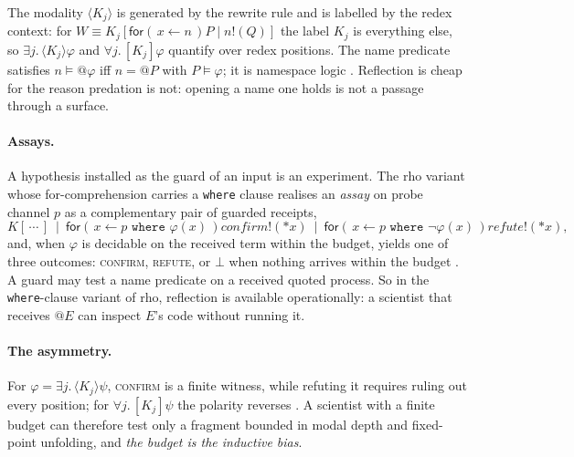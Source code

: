 \documentclass[11pt]{article}
\makeatletter
\theoremstyle{definition}
\theoremstyle{plain}
\theoremstyle{remark}
\newcommand{\quo}[1]{@#1}
\newcommand{\drp}[1]{{*}#1}
\newcommand{\inp}[3]{\mathsf{for}(\,#1 \leftarrow #2\,)#3}
\newcommand{\out}[2]{#1!(#2)}
\makeatother
\begin{document}
\noindent
The modality $\langle K_j\rangle$ is generated by the rewrite rule and is
labelled by the redex context: for $W \equiv K_j[\inp{x}{n}{P} \mid
\out{n}{Q}]$ the label $K_j$ is everything else, so $\exists j.\,\langle
K_j\rangle\varphi$ and $\forall j.\,[K_j]\varphi$ quantify over redex
positions. The name predicate satisfies $n \models @\varphi$ iff $n =
\quo{P}$ with $P \models \varphi$; it is namespace logic \cite{NamespaceLogic}.
Reflection is cheap for the reason predation is not: opening a name one
holds is not a passage through a surface.

\paragraph{Assays.} A hypothesis installed as the guard of an input is an
experiment. The rho variant whose for-comprehension carries a
\texttt{where} clause \cite{Omnibus} realises an \emph{assay} on probe
channel $p$ as a complementary pair of guarded receipts,
\[
K[\,\cdots\,] \ \mid\ \inp{x}{p \texttt{ where } \varphi(x)}{\out{\mathit{confirm}}{\drp{x}}}
\ \mid\ \inp{x}{p \texttt{ where } \lnot\varphi(x)}{\out{\mathit{refute}}{\drp{x}}},
\]
and, when $\varphi$ is decidable on the received term within the budget,
yields one of three outcomes: \textsc{confirm}, \textsc{refute}, or $\bot$
when nothing arrives within the budget \cite[Prop.~Trichotomy]{Scientist}. A guard may test a name predicate on a
received quoted process. So in the \texttt{where}-clause variant of rho,
reflection is available operationally: a scientist that receives
$\quo{E}$ can inspect $E$'s code without running it.

\paragraph{The asymmetry.} For $\varphi = \exists j.\,\langle K_j\rangle
\psi$, \textsc{confirm} is a finite witness, while refuting it requires
ruling out every position; for $\forall j.\,[K_j]\psi$ the polarity
reverses \cite[Prop.~Asymmetry]{Scientist}. A scientist with a finite
budget can therefore test only a fragment bounded in modal depth and
fixed-point unfolding, and \emph{the budget is the inductive bias}.
\end{document}
